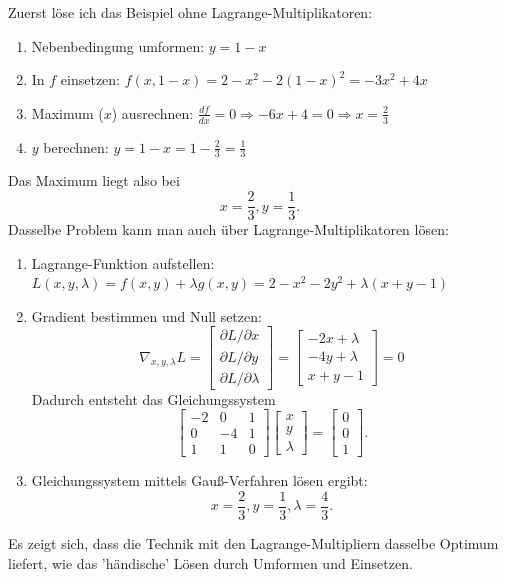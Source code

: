 \documentclass{article}
\begin{document}
Zuerst löse ich das Beispiel ohne Lagrange-Multiplikatoren:
\begin{enumerate}
    \item Nebenbedingung umformen: \(y=1-x\)
    \item In \(f\) einsetzen: \(f(x,1-x)=2-x^2-2(1-x)^2=-3x^2+4x\)
    \item Maximum (\(x\)) ausrechnen: \(\frac{df}{dx}=0\Longrightarrow-6x+4=0\Longrightarrow x=\frac23\)
    \item \(y\) berechnen: \(y=1-x=1-\frac23=\frac13\)
\end{enumerate}
Das Maximum liegt also bei\[
x=\frac23,y=\frac13.
\]
Dasselbe Problem kann man auch über Lagrange-Multiplikatoren lösen:
\begin{enumerate}
    \item Lagrange-Funktion aufstellen: \(L(x,y,\lambda)=f(x,y)+\lambda g(x,y)=2-x^2-2y^2+\lambda(x+y-1)\)
    \item Gradient bestimmen und Null setzen:\[
    \nabla_{x,y,\lambda}L=\begin{bmatrix}
        \partial L/\partial x\\\partial L/\partial y\\\partial L/\partial \lambda
    \end{bmatrix}=\begin{bmatrix}
        -2x+\lambda\\-4y+\lambda\\x+y-1
    \end{bmatrix}=0
    \]Dadurch entsteht das Gleichungssystem\[
    \begin{bmatrix}
        -2&0&1\\0&-4&1\\1&1&0
    \end{bmatrix}\begin{bmatrix}
        x\\y\\\lambda
    \end{bmatrix}=\begin{bmatrix}
        0\\0\\1
    \end{bmatrix}.
    \]
    \item Gleichungssystem mittels Gauß-Verfahren lösen ergibt:\[
    x=\frac23, y=\frac13,\lambda=\frac43.
    \]
\end{enumerate}
Es zeigt sich, dass die Technik mit den Lagrange-Multipliern dasselbe Optimum liefert, wie das 'händische' Lösen durch Umformen und Einsetzen.
\end{document}
